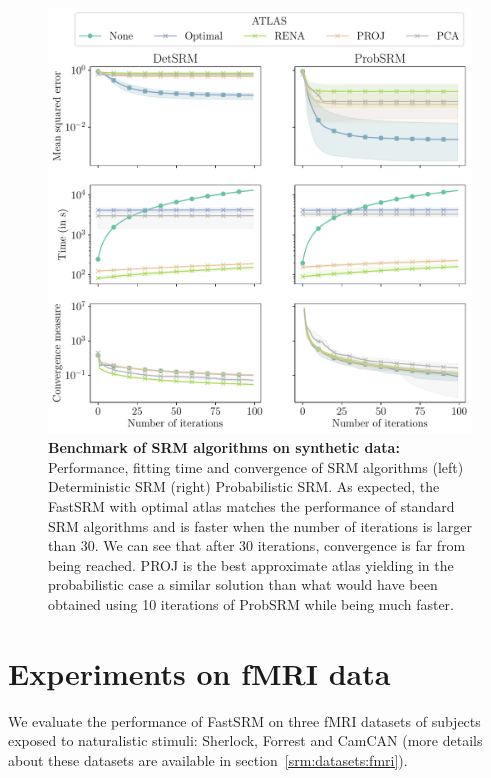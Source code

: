 \begin{figure}
  \centering
  \includegraphics[width=\textwidth]{figures/srm/synthetic_gradient.pdf}
  \caption{\textbf{Benchmark of SRM algorithms on synthetic data: } Performance,
    fitting time and convergence of SRM algorithms (left) Deterministic SRM
    (right) Probabilistic SRM.  As expected, the FastSRM with optimal atlas matches the performance of standard SRM algorithms and is faster when the number of
    iterations is larger than 30. We can see that after 30 iterations,
    convergence is far from being reached. PROJ is the best approximate atlas
    yielding in the probabilistic case a similar solution than what would have
    been obtained using 10 iterations of ProbSRM while being much faster.}
  \label{fig:srm:synthetic_gradient}
\end{figure}

\section{Experiments on fMRI data}
We evaluate the performance of FastSRM on three fMRI datasets of subjects
exposed to naturalistic stimuli: Sherlock, Forrest and CamCAN (more details
about these datasets are available in section~\ref{srm:datasets:fmri}).
